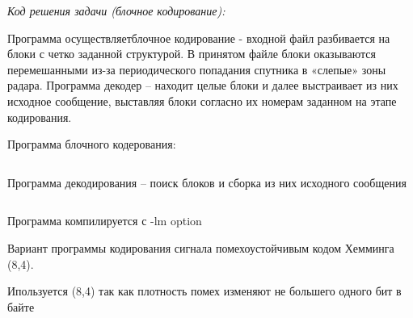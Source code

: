 \solutionSection

\textit{Код решения задачи (блочное кодирование):}

Программа осуществляетблочное кодирование - входной файл разбивается на блоки с четко заданной структурой. В принятом файле блоки оказываются перемешанными из-за периодического попадания спутника в «слепые» зоны радара. Программа декодер – находит целые блоки и далее выстраивает из них исходное сообщение, выставляя блоки согласно их номерам заданном на этапе кодирования.

Программа блочного кодерования:

\inputminted[fontsize=\footnotesize, linenos]{cpp}{final/command_tour/telecom/task_02/source_1.cpp}

Программа декодирования – поиск блоков и сборка из них исходного сообщения

\inputminted[fontsize=\footnotesize, linenos]{cpp}{final/command_tour/telecom/task_02/source_2.cpp}

Программа компилируется с -lm option

Вариант программы кодирования сигнала помехоустойчивым кодом Хемминга (8,4).

Ипользуется (8,4) так как плотность помех изменяют не большего одного бит в байте

\inputminted[fontsize=\footnotesize, linenos]{cpp}{final/command_tour/telecom/task_02/source_3.cpp}